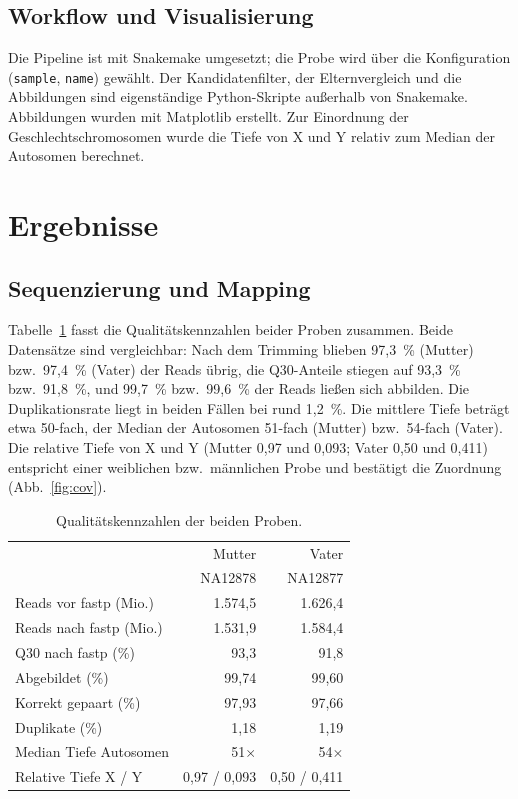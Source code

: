 \documentclass[10pt,a4paper,twocolumn]{article}
\begin{document}
\subsection{Workflow und Visualisierung}
Die Pipeline ist mit Snakemake \citep{molder2021} umgesetzt; die Probe wird \"uber die Konfiguration (\texttt{sample}, \texttt{name}) gew\"ahlt. Der Kandidatenfilter, der Elternvergleich und die Abbildungen sind eigenst\"andige Python-Skripte au\ss erhalb von Snakemake. Abbildungen wurden mit Matplotlib \citep{hunter2007} erstellt. Zur Einordnung der Geschlechtschromosomen wurde die Tiefe von X und Y relativ zum Median der Autosomen berechnet.

\section{Ergebnisse}
\subsection{Sequenzierung und Mapping}
Tabelle~\ref{tab:qc} fasst die Qualit\"atskennzahlen beider Proben zusammen. Beide Datens\"atze sind vergleichbar: Nach dem Trimming blieben 97,3~\% (Mutter) bzw.\ 97,4~\% (Vater) der Reads \"ubrig, die Q30-Anteile stiegen auf 93,3~\% bzw.\ 91,8~\%, und 99,7~\% bzw.\ 99,6~\% der Reads lie\ss en sich abbilden. Die Duplikationsrate liegt in beiden F\"allen bei rund 1,2~\%. Die mittlere Tiefe betr\"agt etwa 50-fach, der Median der Autosomen 51-fach (Mutter) bzw.\ 54-fach (Vater). Die relative Tiefe von X und Y (Mutter 0,97 und 0,093; Vater 0,50 und 0,411) entspricht einer weiblichen bzw.\ m\"annlichen Probe und best\"atigt die Zuordnung (Abb.~\ref{fig:cov}).

\begin{table}[t]
\centering
\small
\caption{Qualit\"atskennzahlen der beiden Proben.}
\label{tab:qc}
\begin{tabular}{@{}lrr@{}}
\toprule
 & Mutter & Vater\\
 & NA12878 & NA12877\\
\midrule
Reads vor fastp (Mio.) & 1.574,5 & 1.626,4\\
Reads nach fastp (Mio.) & 1.531,9 & 1.584,4\\
Q30 nach fastp (\%) & 93,3 & 91,8\\
Abgebildet (\%) & 99,74 & 99,60\\
Korrekt gepaart (\%) & 97,93 & 97,66\\
Duplikate (\%) & 1,18 & 1,19\\
Median Tiefe Autosomen & 51$\times$ & 54$\times$\\
Relative Tiefe X / Y & 0,97 / 0,093 & 0,50 / 0,411\\
\bottomrule
\end{tabular}
\end{table}
\end{document}
